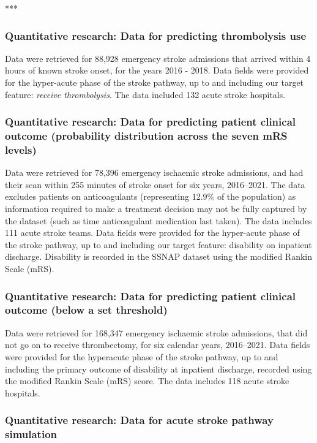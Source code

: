 ***


\subsubsection{Quantitative research: Data for predicting thrombolysis use}

Data were retrieved for 88,928 emergency stroke admissions that arrived within 4 hours of known stroke onset, for the years 2016 - 2018. Data fields were provided for the hyper-acute phase of the stroke pathway, up to and including our target feature: \emph{receive thrombolysis}. The data included 132 acute stroke hospitals.

\subsubsection{Quantitative research: Data for predicting patient clinical outcome (probability distribution across the seven mRS levels)}

Data were retrieved for 78,396 emergency ischaemic stroke admissions, and had their scan within 255 minutes of stroke onset for six years, 2016–2021. The data excludes patients on anticoagulants (representing 12.9\% of the population) as information required to make a treatment decision may not be fully captured by the dataset (such as time anticoagulant medication last taken). The data includes 111 acute stroke teams. Data fields were provided for the hyper-acute phase of the stroke pathway, up to and including our target feature: disability on inpatient discharge. Disability is recorded in the SSNAP dataset using the modified Rankin Scale (mRS).

\subsubsection{Quantitative research: Data for predicting patient clinical outcome (below a set threshold)}

Data were retrieved for 168,347 emergency ischaemic stroke admissions, that did not go on to receive thrombectomy, for six calendar years, 2016–2021. Data fields were provided for the hyperacute phase of the stroke pathway, up to and including the primary outcome of disability at inpatient discharge, recorded using the modified Rankin Scale (mRS) score. The data includes 118 acute stroke hospitals.

\subsubsection{Quantitative research: Data for acute stroke pathway simulation}

